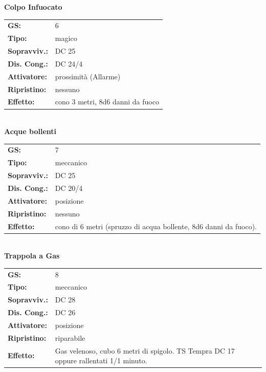 \begin{multicols}{2}
\textbf{Colpo Infuocato}

\begin{tabularx}{0.48\textwidth}{lX}
	\textbf{GS:} & 6 \\
	\textbf{Tipo:} & magico \\
	\textbf{Sopravviv.:} & DC 25 \\
	\textbf{Dis. Cong.:} & DC 24/4 \\
	\textbf{Attivatore:} & prossimità (Allarme) \\
	\textbf{Ripristino:} & nessuno \\
	\textbf{Effetto:} & cono 3 metri, 8d6 danni da fuoco
\end{tabularx}\\

%

\textbf{Acque bollenti}

\begin{tabularx}{0.48\textwidth}{lX}
	\textbf{GS:} & 7 \\
	\textbf{Tipo:} & meccanico \\
	\textbf{Sopravviv.:} & DC 25 \\
	\textbf{Dis. Cong.:} & DC 20/4 \\
	\textbf{Attivatore:} & posizione \\
	\textbf{Ripristino:} & nessuno \\
	\textbf{Effetto:} & cono di 6 metri (spruzzo di acqua bollente, 8d6 danni da fuoco).
\end{tabularx}\\

\textbf{Trappola a Gas}

\begin{tabularx}{0.48\textwidth}{lX}
	\textbf{GS:} & 8 \\
	\textbf{Tipo:} & meccanico \\
	\textbf{Sopravviv.:} & DC 28 \\
	\textbf{Dis. Cong.:} & DC 26 \\
	\textbf{Attivatore:} & posizione \\
	\textbf{Ripristino:} & riparabile \\
	\textbf{Effetto:} & Gas velenoso, cubo 6 metri di spigolo. TS Tempra DC 17 oppure rallentati 1/1 minuto.
\end{tabularx}\\


\end{multicols}
